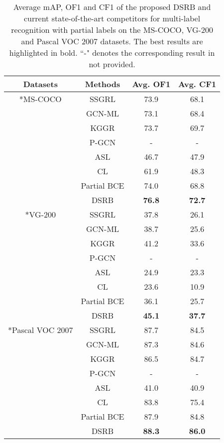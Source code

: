 \documentclass[lettersize,journal]{IEEEtran}
\begin{document}
\begin{table}[!h]
  \centering
  \begin{tabular}{@{\hspace{0.5ex}}c@{\hspace{0.5ex}}|@{\hspace{0.5ex}}c@{\hspace{0.5ex}}|cc}
  \hline
  \centering Datasets & Methods & Avg. OF1 & Avg. CF1 \\
  \hline
  \hline
  \centering \multirow{8}*{MS-COCO} & SSGRL & 73.9 & 68.1 \\
  \centering ~ & GCN-ML & 73.1 & 68.4 \\
  \centering ~ & KGGR & 73.7 & 69.7 \\
  \centering ~ & P-GCN & - & - \\
  \centering ~ & ASL & 46.7 & 47.9 \\
  \centering ~ & CL & 61.9 & 48.3 \\
  \centering ~ & Partial BCE & 74.0 & 68.8 \\
  \centering ~ & DSRB & \textbf{76.8} & \textbf{72.7} \\
  \hline
  \hline
  \centering \multirow{8}*{VG-200} & SSGRL & 37.8 & 26.1 \\
  \centering ~ & GCN-ML & 38.7 & 25.6 \\
  \centering ~ & KGGR & 41.2 & 33.6 \\
  \centering ~ & P-GCN & - & - \\
  \centering ~ & ASL & 24.9 & 23.3 \\
  \centering ~ & CL & 23.6 & 10.9 \\
  \centering ~ & Partial BCE & 36.1 & 25.7 \\
  \centering ~ & DSRB & \textbf{45.1} & \textbf{37.7} \\
  \hline
  \hline
  \centering \multirow{8}*{Pascal VOC 2007} & SSGRL & 87.7 & 84.5 \\
  \centering ~ & GCN-ML & 87.3 & 84.6 \\
  \centering ~ & KGGR & 86.5 & 84.7 \\
  \centering ~ & P-GCN & - & - \\
  \centering ~ & ASL & 41.0 & 40.9 \\
  \centering ~ & CL & 83.8 & 75.4 \\
  \centering ~ & Partial BCE & 87.9 & 84.8 \\
  \centering ~ & DSRB & \textbf{88.3} & \textbf{86.0} \\
  \hline
  \end{tabular}
  \vspace{10pt}
  \caption{Average mAP, OF1 and CF1 of the proposed DSRB and current state-of-the-art competitors for multi-label recognition with partial labels on the MS-COCO, VG-200 and Pascal VOC 2007 datasets. The best results are highlighted in bold. ``-" denotes the corresponding result in not provided.}
  \label{tab:average-results}
\end{table}
\end{document}
